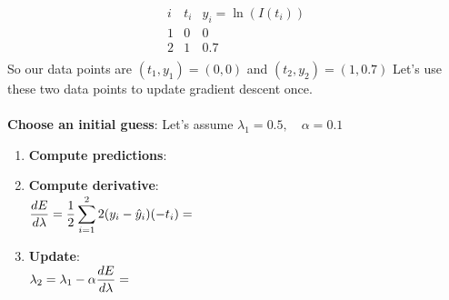 \documentclass[11pt]{article}
\begin{document}
\[
\begin{array}{c|c|c}
i&t_i & y_i = \ln \left(I(t_i)\right) \\
\hline
1&0 & 0 \\
2&1 & 0.7 \\
\end{array}
\]
So our data points are $(t_1,y_1)=(0,0)$ and $(t_2,y_2)=(1,0.7)$ Let's use these two data points to update gradient descent once.\\\\
{\bf Choose an initial guess}:  Let's assume
$
\lambda_1 = 0.5, \quad \alpha = 0.1
$\\

\begin{enumerate}


\item {\bf Compute predictions}:
        
\item {\bf   Compute derivative}:\\
$\displaystyle 
\frac{dE}{d\lambda} = \frac{1}{2} \sum_{i=1}^2 2(y_i - \hat{y}_i)(-t_i)
= 
$\\

\item {\bf Update}:\\
$\displaystyle 
\lambda_2 = \lambda_1 - \alpha \frac{dE}{d\lambda}
= 
$\\
\vspace{2cm}

\end{enumerate}
\end{document}
